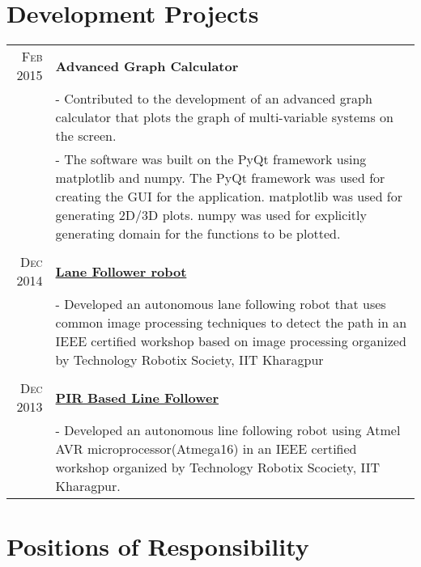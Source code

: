 \documentclass[a4paper,10pt]{article} %
\begin{document}
\section{Development Projects}

\begin{tabular}{r|p{11cm}}

\textsc{Feb 2015} & \textbf{Advanced Graph Calculator} \\
& \footnotesize{- Contributed to the development of an advanced graph calculator that plots the graph of multi-variable systems on the screen.}\\
& \footnotesize{- The software was built on the PyQt framework using matplotlib and numpy. The PyQt framework was used for creating the GUI for the application. matplotlib was used for generating 2D/3D plots. numpy was used for explicitly generating domain for the functions to be plotted.}\\
\multicolumn{2}{c}{} \\

\textsc{Dec 2014} & \textbf{\href{http://www.robotix.in/tutorials/categ/opencv/lane_follow}{Lane Follower robot}} \\
& \footnotesize{- Developed an autonomous lane following robot that uses common image processing techniques to detect the path in an IEEE certified workshop based on image processing organized by Technology Robotix Society, IIT Kharagpur}\\
\multicolumn{2}{c}{} \\

\textsc{Dec 2013} & \textbf{\href{http://www.robotix.in/tutorials/categ/auto/lfr}{PIR Based Line Follower}} \\
& \footnotesize{- Developed an autonomous line following robot using Atmel AVR microprocessor(Atmega16) in an IEEE certified workshop organized by Technology Robotix Scociety, IIT Kharagpur.}\\
\end{tabular}



\section{Positions of Responsibility}
\end{document}
